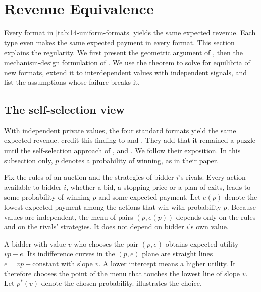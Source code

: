 \section{Revenue Equivalence}\label{sec:14-ret}

Every format in \cref{tab:14-uniform-formats} yields the same expected revenue. Each type even makes the same expected payment in every format. This section explains the regularity. We first present the geometric argument of \citet{MilgromWeber1982}, then the mechanism-design formulation of \citet{Myerson1981}. We use the theorem to solve for equilibria of new formats, extend it to interdependent values with independent signals, and list the assumptions whose failure breaks it.

\subsection{The self-selection view}\label{sec:14-ret-selfselection}

With independent private values, the four standard formats yield the same expected revenue.  credit this finding to \citet{OrtegaReichert1968} and \citet{Vickrey1962}. They add that it remained a puzzle until the self-selection approach of \citet{HarrisRaviv1981}, \citet{Myerson1981} and \citet{RileySamuelson1981}. We follow their exposition. In this subsection only, $p$ denotes a probability of winning, as in their paper.

Fix the rules of an auction and the strategies of bidder $i$'s rivals. Every action available to bidder $i$, whether a bid, a stopping price or a plan of exits, leads to some probability of winning $p$ and some expected payment. Let $e(p)$ denote the lowest expected payment among the actions that win with probability $p$. Because values are independent, the menu of pairs $(p,e(p))$ depends only on the rules and on the rivals' strategies. It does not depend on bidder $i$'s own value.

A bidder with value $v$ who chooses the pair $(p,e)$ obtains expected utility $vp-e$. Its indifference curves in the $(p,e)$ plane are straight lines $e=vp-\text{constant}$ with slope $v$. A lower intercept means a higher utility. It therefore chooses the point of the menu that touches the lowest line of slope $v$. Let $p^*(v)$ denote the chosen probability.  illustrates the choice.

